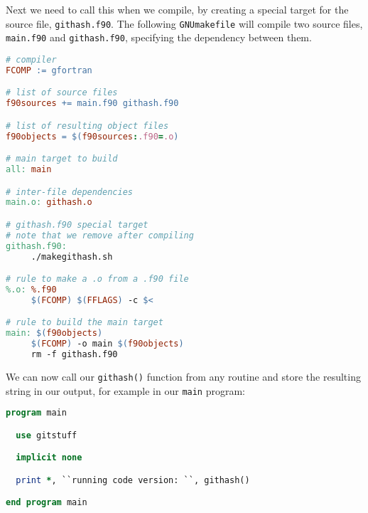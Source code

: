 Next we need to call this when we compile, by creating
a special target for the source file, {\tt githash.f90}.
The following {\tt GNUmakefile} will compile two source
files, {\tt main.f90} and {\tt githash.f90}, specifying
the dependency between them.

\begin{lstlisting}[language={make}]
# compiler
FCOMP := gfortran

# list of source files
f90sources += main.f90 githash.f90

# list of resulting object files
f90objects = $(f90sources:.f90=.o)

# main target to build
all: main

# inter-file dependencies
main.o: githash.o

# githash.f90 special target
# note that we remove after compiling
githash.f90:
     ./makegithash.sh

# rule to make a .o from a .f90 file
%.o: %.f90
     $(FCOMP) $(FFLAGS) -c $<

# rule to build the main target
main: $(f90objects)
     $(FCOMP) -o main $(f90objects)
     rm -f githash.f90
\end{lstlisting}

We can now call our {\tt githash()} function from any routine
and store the resulting string in our output, for example
in our {\tt main} program:

\begin{lstlisting}[language={fortran}]
program main

  use gitstuff

  implicit none

  print *, ``running code version: ``, githash()

end program main
\end{lstlisting}
  



